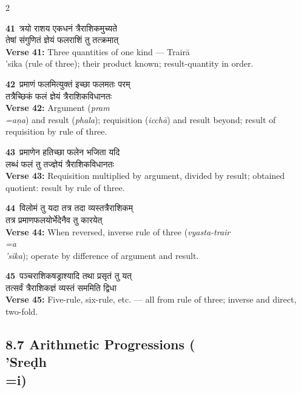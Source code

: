 \documentclass[11pt,a4paper]{article}
\newcommand{\dev}[1]{{\devanagarifont #1}}
\newcommand{\iast}[1]{\textit{#1}}
\newcommand{\vnum}[1]{\textcolor{versenumbercolor}{\textbf{#1}}}
\begin{document}
\begin{paracol}{2}

\switchcolumn[0]
\vnum{41}\ \dev{त्रयो राशय एकधनं त्रैराशिकमुच्यते}\\
\dev{तेषां संगुणितं ज्ञेयं फलराशिं तु तत्क्रमात्}\\
\switchcolumn[1]
\textbf{Verse 41:} Three quantities of one kind --- Trair\=a\\'sika (rule of three); their product known; result-quantity in order.

\switchcolumn[0]
\vnum{42}\ \dev{प्रमाणं फलमित्युक्तं इच्छा फलमतः परम्}\\
\dev{तत्रैच्छिकं फलं ज्ञेयं त्रैराशिकविधानतः}\\
\switchcolumn[1]
\textbf{Verse 42:} Argument (\iast{pram\\=a\d na}) and result (\iast{phala}); requisition (\iast{icch\=a}) and result beyond; result of requisition by rule of three.

\switchcolumn[0]
\vnum{43}\ \dev{प्रमाणेन हतिच्छा फलेन भजिता यदि}\\
\dev{लब्धं फलं तु तज्ज्ञेयं त्रैराशिकविधानतः}\\
\switchcolumn[1]
\textbf{Verse 43:} Requisition multiplied by argument, divided by result; obtained quotient: result by rule of three.

\switchcolumn[0]
\vnum{44}\ \dev{विलोमं तु यदा तत्र तदा व्यस्तत्रैराशिकम्}\\
\dev{तत्र प्रमाणफलयोर्भेदेनैव तु कारयेत्}\\
\switchcolumn[1]
\textbf{Verse 44:} When reversed, inverse rule of three (\iast{vyasta-trair\\=a\\'sika}); operate by difference of argument and result.

\switchcolumn[0]
\vnum{45}\ \dev{पञ्चराशिकषड्राश्यादि तथा प्रसृतं तु यत्}\\
\dev{तत्सर्वं त्रैराशिकज्ञं व्यस्तं सममिति द्विधा}\\
\switchcolumn[1]
\textbf{Verse 45:} Five-rule, six-rule, etc. --- all from rule of three; inverse and direct, two-fold.

\end{paracol}

\subsection*{8.7 Arithmetic Progressions (\\'Sre\d dh\\=i)}
\label{sec:8.7}
\end{document}
